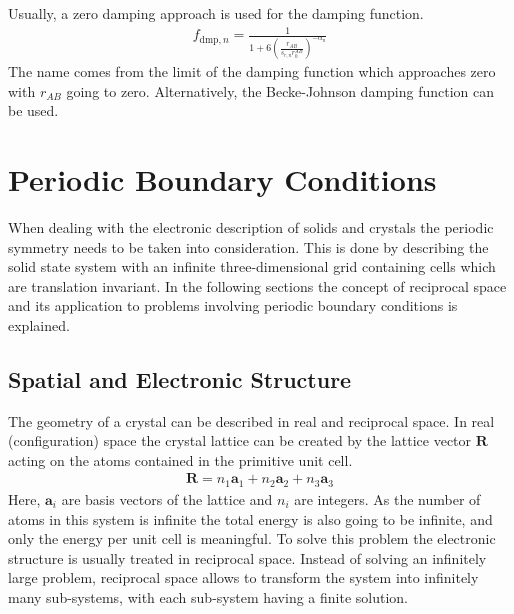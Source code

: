 Usually, a zero damping approach is used for the damping function.
%
\begin{align}
	f_{\text{dmp},n} = \frac{1}{1+6\left( \frac{r_{AB}}{s_{r,n}r_0^{AB}} \right)^{-\alpha_n}}
\end{align}
%
The name comes from the limit of the damping function which approaches zero
with $r_{AB}$ going to zero. Alternatively, the Becke-Johnson damping
function\autocite{Grimme_Effectdampingfunction_2011} can be used. 

\section{Periodic Boundary Conditions}
\label{sec:PBC}

When dealing with the electronic description of solids and crystals the
periodic symmetry needs to be taken into consideration. This is done by
describing the solid state system with an infinite three-dimensional grid
containing cells which are translation invariant. In
the following sections the concept of reciprocal space and its application to
problems involving periodic boundary conditions is explained.

\subsection{Spatial and Electronic Structure}
\label{sec:SpatialandElectronicStructure}

The geometry of a crystal can be described in real and reciprocal space. In real
(configuration) space the crystal lattice can be created by the lattice vector
$\mathbf{R}$ acting on the atoms contained in the primitive unit cell.
%
\begin{align}
    \mathbf{R}=n_1\mathbf{a}_1+n_2\mathbf{a}_2+n_3\mathbf{a}_3    
\end{align}
%
Here, $\mathbf{a}_i$ are basis vectors of the lattice and $n_i$ are integers.
As the number of atoms in this system is infinite the total energy is also
going to be infinite, and only the energy per unit cell is meaningful. To solve
this problem the electronic structure is usually treated in reciprocal space.
Instead of solving an infinitely large problem, reciprocal space allows to
transform the system into infinitely many sub-systems, with each sub-system
having a finite solution. 


